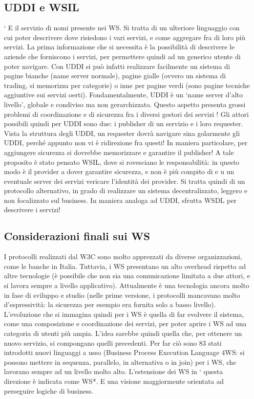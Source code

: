 \subsection{UDDI e WSIL}
`
E il servizio di nomi presente nei WS. Si tratta di un ulteriore linguaggio con
cui poter descrivere dove risiedono i vari servizi, e come aggregare fra di loro
più servizi. La prima informazione che si necessita è la possibilità di descrivere
le aziende che forniscono i servizi, per permettere quindi ad un generico utente
di poter navigare.
Con UDDI si può infatti realizzare facilmente un sistema di pagine bianche
(name server normale), pagine gialle (ovvero un sistema di trading, si memorizza per categorie) o inne per pagine verdi
(sono pagine tecniche aggiuntive
sui servizi oerti). Fondamentalmente, UDDI è un {`}name server d'alto livello',
globale e condiviso ma non gerarchizzato. Questo aspetto presenta grossi problemi di coordinazione e di sicurezza fra i
diversi gestori dei servizi !
Gli attori possibili quindi per UDDI sono due: i publisher di un servizio e i
loro requester. Vista la struttura degli UDDI, un requester dovrà navigare sina
golarmente gli UDDI, perché appunto non vi è ridirezione fra questi! In maniera
particolare, per aggiungere sicurezza si dovrebbe memorizzare e garantire il publisher!
A tale proposito è stato pensato WSIL, dove si rovesciano le responsabilità:
in questo modo è il provider a dover garantire sicurezza, e non è più compito di
e u
un eventuale server dei servizi vericare l'identità dei provider. Si tratta quindi
di un protocollo alternativo, in grado di realizzare un sistema decentralizzato,
leggero e non focalizzato sul business. In maniera analoga ad UDDI, sfrutta
WSDL per descrivere i servizi!
\subsection{Considerazioni finali sui WS}
I protocolli realizzati dal W3C sono molto apprezzati da diverse organizzazioni,
come le banche in Italia. Tuttavia, i WS presentano un alto overhead rispetto ad
altre tecnologie (è possibile che non sia una comunicazione limitata a due attori,
e si lavora sempre a livello applicativo). Attualmente è una tecnologia ancora
molto in fase di sviluppo e studio (nelle prime versione, i protocolli mancavano
molto d'espressività: la sicurezza per esempio era fornita solo a basso livello).
L'evoluzione che si immagina quindi per i WS è quella di far evolvere il
sistema, come una composizione e coordinazione dei servizi, per poter aprire i
WS ad una categoria di utenti più ampia. L'idea sarebbe quindi quella che, per
ottenere un nuovo servizio, si compongano quelli precedenti. Per far ciò sono
83
stati introdotti nuovi linguaggi a usso (Business Process Execution Language
4WS: si possono mettere in sequenza, parallelo, in alternativa o in join) per
i WS, che lavorano sempre ad un livello molto alto. L'estensione dei WS in
`
questa direzione è indicata come WS*. E una visione maggiormente orientata
ad perseguire logiche di business.
